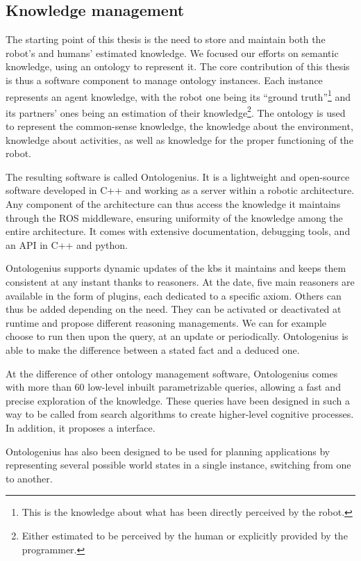\subsection{Knowledge management}

The starting point of this thesis is the need to store and maintain both the robot's and humans' estimated knowledge. We focused our efforts on semantic knowledge, using an ontology to represent it. The core contribution of this thesis is thus a software component to manage ontology instances. Each instance represents an agent knowledge, with the robot one being its ``ground truth''\footnote{This is the knowledge about what has been directly perceived by the robot.} and its partners' ones being an estimation of their knowledge\footnote{Either estimated to be perceived by the human or explicitly provided by the programmer.}. The ontology is used to represent the common-sense knowledge, the knowledge about the environment, knowledge about activities, as well as knowledge for the proper functioning of the robot.

The resulting software is called Ontologenius. It is a lightweight and open-source software developed in C++ and working as a server within a robotic architecture. Any component of the architecture can thus access the knowledge it maintains through the ROS middleware, ensuring uniformity of the knowledge among the entire architecture. It comes with extensive documentation, debugging tools, and an API in C++ and python.

Ontologenius supports dynamic updates of the \acrlong{kb}s it maintains and keeps them consistent at any instant thanks to reasoners. At the date, five main reasoners are available in the form of plugins, each dedicated to a specific axiom. Others can thus be added depending on the need. They can be activated or deactivated at runtime and propose different reasoning managements. We can for example choose to run then upon the query, at an update or periodically. Ontologenius is able to make the difference between a stated fact and a deduced one.

At the difference of other ontology management software, Ontologenius comes with more than 60 low-level inbuilt parametrizable queries, allowing a fast and precise exploration of the knowledge. These queries have been designed in such a way to be called from search algorithms to create higher-level cognitive processes. In addition, it proposes a \sparql{} interface.

Ontologenius has also been designed to be used for planning applications by representing several possible world states in a single instance, switching from one to another.


